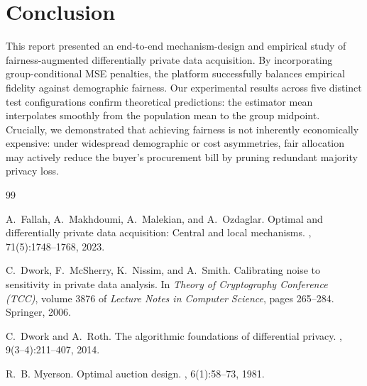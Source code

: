 \documentclass[11pt,a4paper]{article}
\begin{document}
\section{Conclusion}

This report presented an end-to-end mechanism-design and empirical study of fairness-augmented differentially private data acquisition. By incorporating group-conditional MSE penalties, the platform successfully balances empirical fidelity against demographic fairness. Our experimental results across five distinct test configurations confirm theoretical predictions: the estimator mean interpolates smoothly from the population mean to the group midpoint. Crucially, we demonstrated that achieving fairness is not inherently economically expensive: under widespread demographic or cost asymmetries, fair allocation may actively reduce the buyer's procurement bill by pruning redundant majority privacy loss.

\begin{thebibliography}{99}

A.~Fallah, A.~Makhdoumi, A.~Malekian, and A.~Ozdaglar.
\newblock Optimal and differentially private data acquisition: Central and local mechanisms.
, 71(5):1748--1768, 2023.

C.~Dwork, F.~McSherry, K.~Nissim, and A.~Smith.
\newblock Calibrating noise to sensitivity in private data analysis.
\newblock In {\em Theory of Cryptography Conference (TCC)}, volume 3876 of {\em Lecture Notes in Computer Science}, pages 265--284. Springer, 2006.

C.~Dwork and A.~Roth.
\newblock The algorithmic foundations of differential privacy.
, 9(3--4):211--407, 2014.

R.~B. Myerson.
\newblock Optimal auction design.
, 6(1):58--73, 1981.

\end{thebibliography}
\end{document}
